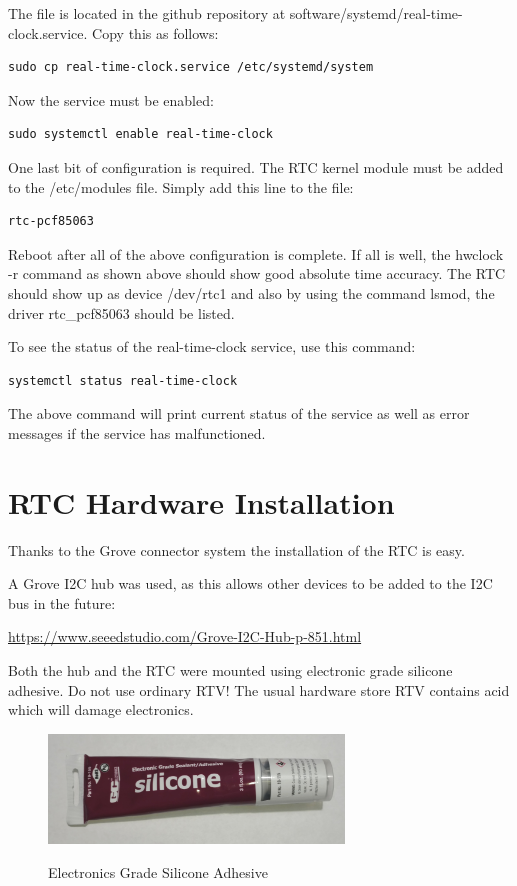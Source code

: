 The file is located in the github repository at software/systemd/real-time-clock.service.
Copy this as follows:

\begin{verbatim}
sudo cp real-time-clock.service /etc/systemd/system
\end{verbatim}

Now the service must be enabled:

\begin{verbatim}
sudo systemctl enable real-time-clock
\end{verbatim}

One last bit of configuration is required.  The RTC kernel module must be added to the /etc/modules file.  Simply add this line to the file:

\begin{verbatim}
rtc-pcf85063
\end{verbatim}

Reboot after all of the above configuration is complete.  If all is well, the hwclock -r command as shown above should show good absolute time accuracy.  The RTC should show up as device /dev/rtc1 and also by using the command lsmod, the driver rtc\_pcf85063 should be listed.

To see the status of the real-time-clock service, use this command:

\begin{verbatim}
systemctl status real-time-clock
\end{verbatim}

The above command will print current status of the service as well as error messages if the service has malfunctioned.

\section{RTC Hardware Installation}

Thanks to the Grove connector system the installation of the RTC is easy.

A Grove I2C hub was used, as this allows other devices to be added to the I2C bus in the future:

\url{https://www.seeedstudio.com/Grove-I2C-Hub-p-851.html}

Both the hub and the RTC were mounted using electronic grade silicone adhesive.  Do not use ordinary RTV!  The usual hardware store RTV contains acid which will damage electronics.

\begin{figure}[H]
	\centering
	\includegraphics[width=0.7\textwidth]{photos/silicone}
	\centering\bfseries
	\caption{Electronics Grade Silicone Adhesive}
\end{figure}

